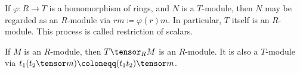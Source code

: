If $\varphi\colon R\to T$ is a homomorphism of rings, and $N$ is a $T$-module,
then $N$ may be regarded as an $R$-module via $rm\coloneqq \varphi(r)m$. In
particular, $T$ itself is an $R$-module. This process is called restriction
of scalars.

If $M$ is an $R$-module, then $T\tensor_R M$ is an $R$-module. It is also a
$T$-module via $t_1(t_2 \tensor m) \coloneqq (t_1t_2)\tensor m$.
